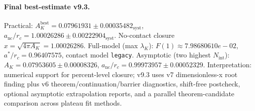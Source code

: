 \paragraph{Final best-estimate v9.3.}
Practical: $A_K^{\mathrm{best}} = 0.07961931 \pm 0.00035482_{\mathrm{syst}}$, $a_{\mathrm{nc}}/r_c = 1.00026286 \pm 0.00222904_{\mathrm{syst}}$.
No-contact closure $x = \sqrt{4\pi A_K} = 1.00026286$.
Full-model (max $\lambda_K$): $F(1) \approx 7.98680610e-02$, $a^*/r_c = 0.96407575$, contact model \texttt{legacy}.
Asymptotic (two highest $N_{\mathrm{int}}$): $A_K = 0.07953605 \pm 0.00008326$, $a_{\mathrm{nc}}/r_c = 0.99973957 \pm 0.00052329$.
Interpretation: numerical support for percent-level closure; v9.3 uses v7 dimensionless-x root finding plus v6 theorem/continuation/barrier diagnostics, shift-free postcheck, optional asymptotic extrapolation reports, and a parallel theorem-candidate comparison across plateau fit methods.
